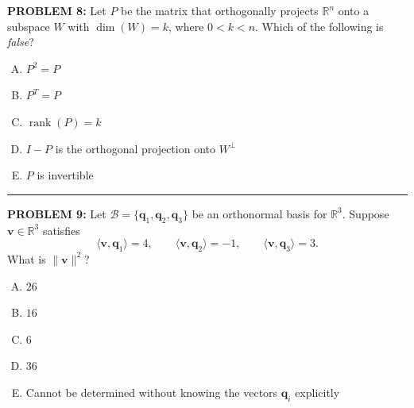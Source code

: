 \documentclass[12pt]{amsart}
\newcommand{\divider}{
  \vspace{-1em} %
  \noindent
  \raisebox{-0.15ex}{\textbullet}%
  \hspace{0.5em}%
  \rule[0.5ex]{0.95\textwidth}{1.0pt}%
  \hspace{0.5em}%
  \raisebox{-0.15ex}{\textbullet}%
  \vspace{0em} %
}
\begin{document}
\newpage



{\bf PROBLEM 8:}
%
Let $P$ be the matrix that orthogonally projects $\mathbb{R}^n$ onto a subspace $W$ with $\dim(W) = k$, where $0 < k < n$. Which of the following is \emph{false}?

\begin{enumerate}[(A)]
\item $P^2 = P$
\item $P^T = P$
\item $\operatorname{rank}(P) = k$
\item $I - P$ is the orthogonal projection onto $W^\perp$
\item $P$ is invertible
\end{enumerate}

%
\divider


{\bf PROBLEM 9:}
%
Let $\mathcal{B} = \{\mathbf{q}_1, \mathbf{q}_2, \mathbf{q}_3\}$ be an orthonormal basis for $\mathbb{R}^3$. Suppose $\mathbf{v} \in \mathbb{R}^3$ satisfies
$$\langle \mathbf{v}, \mathbf{q}_1 \rangle = 4, \qquad \langle \mathbf{v}, \mathbf{q}_2 \rangle = -1, \qquad \langle \mathbf{v}, \mathbf{q}_3 \rangle = 3.$$
What is $\|\mathbf{v}\|^2$?

\begin{enumerate}[(A)]
\item $26$
\item $16$
\item $6$
\item $36$
\item Cannot be determined without knowing the vectors $\mathbf{q}_i$ explicitly
\end{enumerate}
\end{document}
